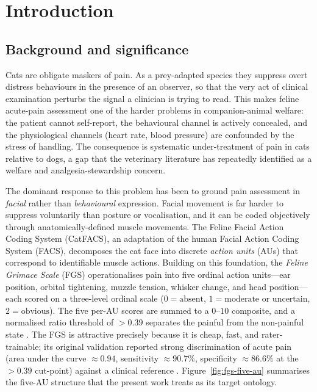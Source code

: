 
\chapter{Introduction}
\label{ch:introduction}

\section{Background and significance}
\label{sec:intro-background}

Cats are obligate maskers of pain. As a prey-adapted species they suppress overt
distress behaviours in the presence of an observer, so that the very act of
clinical examination perturbs the signal a clinician is trying to read. This
makes feline acute-pain assessment one of the harder problems in companion-animal
welfare: the patient cannot self-report, the behavioural channel is actively
concealed, and the physiological channels (heart rate, blood pressure) are
confounded by the stress of handling. The consequence is systematic
under-treatment of pain in cats relative to dogs, a gap that the veterinary
literature has repeatedly identified as a welfare and analgesia-stewardship
concern.

The dominant response to this problem has been to ground pain assessment in
\emph{facial} rather than \emph{behavioural} expression. Facial movement is far
harder to suppress voluntarily than posture or vocalisation, and it can be coded
objectively through anatomically-defined muscle movements. The Feline Facial
Action Coding System (CatFACS), an adaptation of the human Facial Action Coding
System (FACS), decomposes the cat face into discrete \emph{action units} (AUs)
that correspond to identifiable muscle actions. Building on this foundation, the
\emph{Feline Grimace Scale} (FGS) operationalises pain into five ordinal action
units---ear position, orbital tightening, muzzle tension, whisker change, and
head position---each scored on a three-level ordinal scale
($0 = \text{absent}$, $1 = \text{moderate or uncertain}$, $2 = \text{obvious}$).
The five per-AU scores are summed to a $0$--$10$ composite, and a normalised
ratio threshold of $>0.39$ separates the painful from the non-painful state
\autocite{evangelista2019}. The FGS is attractive precisely because it is cheap,
fast, and rater-trainable; its original validation reported strong discrimination
of acute pain (area under the curve $\approx 0.94$, sensitivity $\approx 90.7\%$,
specificity $\approx 86.6\%$ at the $>0.39$ cut-point) against a clinical
reference \autocite{evangelista2019}. Figure~\ref{fig:fgs-five-au} summarises the
five-AU structure that the present work treats as its target ontology.

